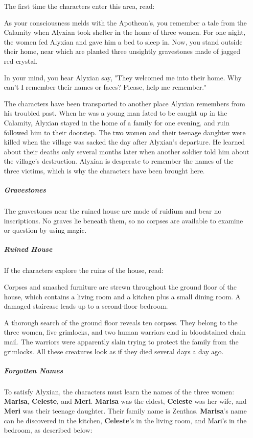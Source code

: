 \documentclass[10pt,a4paper,twoside,bg=print,twocolumn,openany,nodeprecatedcode]{dndbook}
\begin{document}
The first time the characters enter this area, read:

\begin{DndReadAloud}{}
As your consciousness melds with the Apotheon's, you remember a tale from the Calamity when Alyxian took shelter in the home of three women. For one night, the women fed Alyxian and gave him a bed to sleep in. Now, you stand outside their home, near which are planted three unsightly gravestones made of jagged red crystal.

In your mind, you hear Alyxian say, "They welcomed me into their home. Why can't I remember their names or faces? Please, help me remember."

\end{DndReadAloud}

The characters have been transported to another place Alyxian remembers from his troubled past. When he was a young man fated to be caught up in the Calamity, Alyxian stayed in the home of a family for one evening, and ruin followed him to their doorstep. The two women and their teenage daughter were killed when the village was sacked the day after Alyxian's departure. He learned about their deaths only several months later when another soldier told him about the village's destruction. Alyxian is desperate to remember the names of the three victims, which is why the characters have been brought here.

\subparagraph{Gravestones}
The gravestones near the ruined house are made of ruidium and bear no inscriptions. No graves lie beneath them, so no corpses are available to examine or question by using magic.

\subparagraph{Ruined House}
If the characters explore the ruins of the house, read:

\begin{DndReadAloud}{}
Corpses and smashed furniture are strewn throughout the ground floor of the house, which contains a living room and a kitchen plus a small dining room. A damaged staircase leads up to a second-floor bedroom.

\end{DndReadAloud}

A thorough search of the ground floor reveals ten corpses. They belong to the three women, five grimlocks, and two human warriors clad in bloodstained chain mail. The warriors were apparently slain trying to protect the family from the grimlocks. All these creatures look as if they died several days a day ago.

\subparagraph{Forgotten Names}
To satisfy Alyxian, the characters must learn the names of the three women: \textbf{Marisa}, \textbf{Celeste}, and \textbf{Meri}. \textbf{Marisa} was the eldest, \textbf{Celeste} was her wife, and \textbf{Meri} was their teenage daughter. Their family name is Zenthas. \textbf{Marisa}'s name can be discovered in the kitchen, \textbf{Celeste}'s in the living room, and Mari's in the bedroom, as described below:
\end{document}
